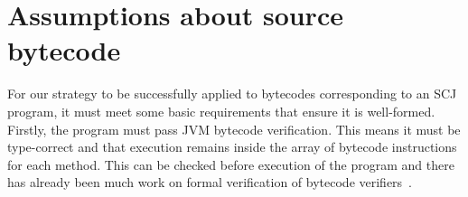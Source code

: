 
\section{Assumptions about source bytecode}
\label{compilation-assumptions-section}

For our strategy to be successfully applied to bytecodes corresponding
to an SCJ program, it must meet some basic requirements that ensure it
is well-formed.
Firstly, the program must pass JVM bytecode verification.
This means it must be type-correct and that execution remains inside
the array of bytecode instructions for each method.
This can be checked before execution of the program and there has
already been much work on formal verification of bytecode
verifiers~\cite{coglio2000,klein2003,xavier2003}.

